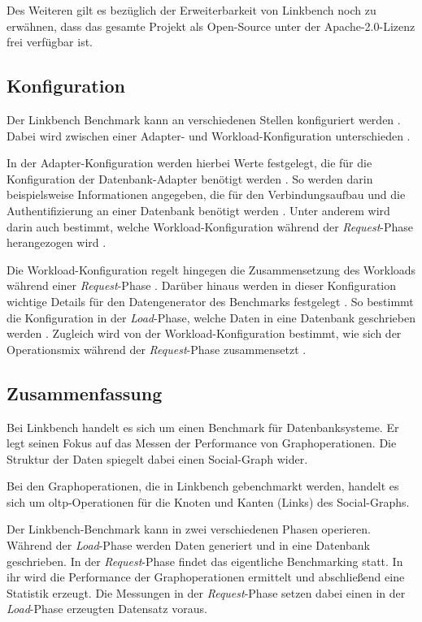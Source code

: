 Des Weiteren gilt es bezüglich der Erweiterbarkeit von Linkbench noch zu erwähnen, dass das gesamte Projekt als Open-Source unter der Apache-2.0-Lizenz frei verfügbar ist.

\subsection{Konfiguration}
Der Linkbench Benchmark kann an verschiedenen Stellen konfiguriert werden \cite{linkbench_paper,fb_linkbench_github}. Dabei wird zwischen einer Adapter- und Workload-Konfiguration unterschieden \cite{fb_linkbench_github}. 

In der Adapter-Konfiguration werden hierbei Werte festgelegt, die für die Konfiguration der Datenbank-Adapter benötigt werden \cite{fb_linkbench_github}. So werden darin beispielsweise Informationen angegeben, die für den Verbindungsaufbau und die Authentifizierung an einer Datenbank benötigt werden \cite{fb_linkbench_github}. Unter anderem wird darin auch bestimmt, welche Workload-Konfiguration während der \textit{Request}-Phase herangezogen wird \cite{fb_linkbench_github}. 

Die Workload-Konfiguration regelt hingegen die Zusammensetzung des Workloads während einer \textit{Request}-Phase \cite{fb_linkbench_github}. Darüber hinaus werden in dieser Konfiguration wichtige Details für den Datengenerator des Benchmarks festgelegt \cite{fb_linkbench_github}. So bestimmt die Konfiguration in der \textit{Load}-Phase, welche Daten in eine Datenbank geschrieben werden \cite{fb_linkbench_github}. Zugleich wird von der Workload-Konfiguration bestimmt, wie sich der Operationsmix während der \textit{Request}-Phase zusammensetzt \cite{fb_linkbench_github}.

\subsection{Zusammenfassung}
Bei Linkbench handelt es sich um einen Benchmark für Datenbanksysteme. Er legt seinen Fokus auf das Messen der Performance von Graphoperationen. Die Struktur der Daten spiegelt dabei einen Social-Graph wider. 

Bei den Graphoperationen, die in Linkbench gebenchmarkt werden, handelt es sich um \acs{oltp}-Operationen für die Knoten und Kanten (Links) des Social-Graphs.

Der Linkbench-Benchmark kann in zwei verschiedenen Phasen operieren. Während der \textit{Load}-Phase werden Daten generiert und in eine Datenbank geschrieben. In der \textit{Request}-Phase findet das eigentliche Benchmarking statt. In ihr wird die Performance der Graphoperationen ermittelt und abschließend eine Statistik erzeugt. Die Messungen in der \textit{Request}-Phase setzen dabei einen in der \textit{Load}-Phase erzeugten Datensatz voraus. 

